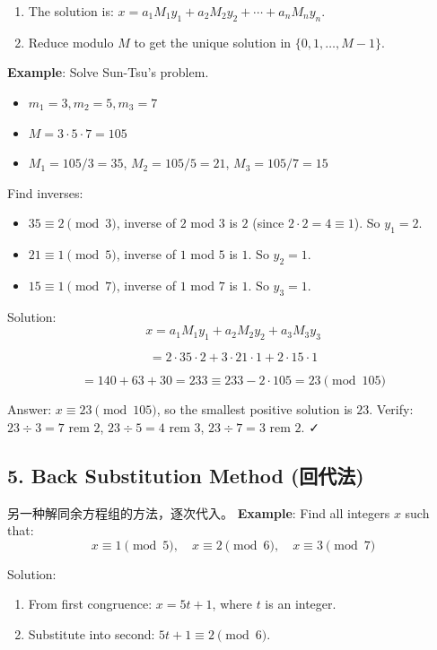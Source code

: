 \documentclass[10pt,a4paper,openany]{ctexbook}
\theoremstyle{definition}
\theoremstyle{remark}
\begin{document}
\begin{enumerate}
\item The solution is: $x = a_1 M_1 y_1 + a_2 M_2 y_2 + \cdots + a_n M_n y_n$.
\item Reduce modulo $M$ to get the unique solution in $\{0, 1, \dots, M-1\}$.

\end{enumerate}

\textbf{Example}: Solve Sun-Tsu's problem.
\begin{itemize}
\item $m_1 = 3, m_2 = 5, m_3 = 7$
\item $M = 3 \cdot 5 \cdot 7 = 105$
\item $M_1 = 105/3 = 35$, $M_2 = 105/5 = 21$, $M_3 = 105/7 = 15$

\end{itemize}

Find inverses:
\begin{itemize}
\item $35 \equiv 2 \pmod{3}$, inverse of $2$ mod $3$ is $2$ (since $2 \cdot 2 = 4 \equiv 1$). So $y_1 = 2$.
\item $21 \equiv 1 \pmod{5}$, inverse of $1$ mod $5$ is $1$. So $y_2 = 1$.
\item $15 \equiv 1 \pmod{7}$, inverse of $1$ mod $7$ is $1$. So $y_3 = 1$.

\end{itemize}

Solution:
\[
x = a_1 M_1 y_1 + a_2 M_2 y_2 + a_3 M_3 y_3
\]

\[
= 2 \cdot 35 \cdot 2 + 3 \cdot 21 \cdot 1 + 2 \cdot 15 \cdot 1
\]

\[
= 140 + 63 + 30 = 233 \equiv 233 - 2 \cdot 105 = 23 \pmod{105}
\]

Answer: $x \equiv 23 \pmod{105}$, so the smallest positive solution is $23$.
Verify: $23 \div 3 = 7$ rem $2$, $23 \div 5 = 4$ rem $3$, $23 \div 7 = 3$ rem $2$. ✓
\vspace{-2pt}

\subsection{5. Back Substitution Method (回代法)}

另一种解同余方程组的方法，逐次代入。
\textbf{Example}: Find all integers $x$ such that:
\[
x \equiv 1 \pmod{5}, \quad x \equiv 2 \pmod{6}, \quad x \equiv 3 \pmod{7}
\]

Solution:
\begin{enumerate}
\item From first congruence: $x = 5t + 1$, where $t$ is an integer.
\item Substitute into second: $5t + 1 \equiv 2 \pmod{6}$.
\end{enumerate}
\end{document}
